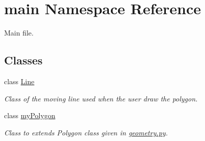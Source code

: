 \hypertarget{namespacemain}{}\section{main Namespace Reference}
\label{namespacemain}


Main file.  


\subsection*{Classes}
\begin{DoxyCompactItemize}
\item 
class \hyperlink{classmain_1_1Line}{Line}
\begin{DoxyCompactList}\small\item\em Class of the moving line used when the user draw the polygon. \end{DoxyCompactList}\item 
class \hyperlink{classmain_1_1myPolygon}{my\+Polygon}
\begin{DoxyCompactList}\small\item\em Class to extends Polygon class given in \hyperlink{geometry_8py}{geometry.\+py}. \end{DoxyCompactList}\end{DoxyCompactItemize}
